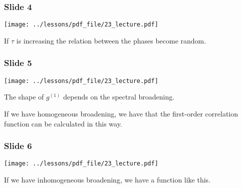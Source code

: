 \documentclass[../main/main.tex]{subfiles}
\begin{document}
\newpage

\subsubsection*{Slide 4}

\begin{minipage}[]{0.5\linewidth}
\centering
\texttt{[image: ../lessons/pdf\_file/23\_lecture.pdf]}
\end{minipage}
\hspace{0.3cm}\vspace{0.3cm}
\begin{minipage}[c]{0.47\linewidth}

If \( \tau  \) is increasing the relation between the phases become random.

\end{minipage}

\subsubsection*{Slide 5}

\begin{minipage}[]{0.5\linewidth}
\centering
\texttt{[image: ../lessons/pdf\_file/23\_lecture.pdf]}
\end{minipage}
\hspace{0.3cm}\vspace{0.3cm}
\begin{minipage}[c]{0.47\linewidth}

The shape of \( g^{(1)} \) depends on the spectral broadening.

If we have homogeneous broadening, we have that the first-order correlation function can be calculated in this way.

\end{minipage}

\subsubsection*{Slide 6}

\begin{minipage}[]{0.5\linewidth}
\centering
\texttt{[image: ../lessons/pdf\_file/23\_lecture.pdf]}
\end{minipage}
\hspace{0.3cm}\vspace{0.3cm}
\begin{minipage}[c]{0.47\linewidth}

If we have inhomogeneous broadening, we have a function like this.

\end{minipage}
\end{document}
